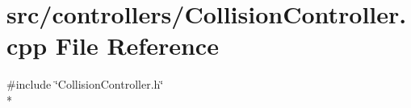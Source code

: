 \section{src/controllers/\-Collision\-Controller.cpp File Reference}
\label{_collision_controller_8cpp}
{\ttfamily \#include \char`\"{}Collision\-Controller.\-h\char`\"{}}\\*
